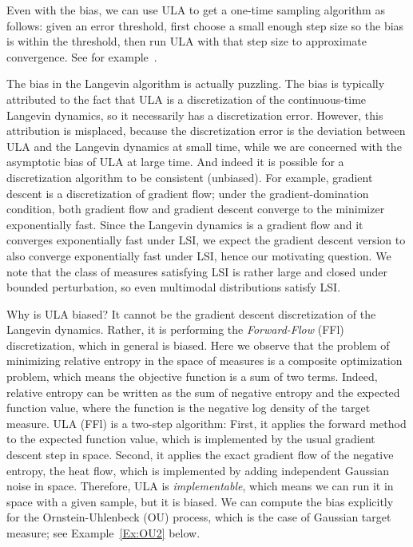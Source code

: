 \documentclass[final,12pt]{colt2018}
\begin{document}
Even with the bias, we can use ULA to get a one-time sampling algorithm as follows:
given an error threshold, first choose a small enough step size so the bias is within the threshold, then run ULA with that step size to approximate convergence.
See for example~\cite{D17,D17a,DK17,DM16,CB17}.

The bias in the Langevin algorithm is actually puzzling.
The bias is typically attributed to the fact that ULA is a discretization of the continuous-time Langevin dynamics, so it necessarily has a discretization error.
However, this attribution is misplaced, because
the discretization error is the deviation between ULA and the Langevin dynamics at small time,
while
we are concerned with
the asymptotic bias of ULA at large time. 
And indeed it is possible for a discretization algorithm to be consistent (unbiased).
For example, gradient descent is a discretization of gradient flow; under the gradient-domination condition, both gradient flow and gradient descent converge to the minimizer exponentially fast.
Since the Langevin dynamics is a gradient flow and it converges exponentially fast under LSI, we expect the gradient descent version to also converge exponentially fast under LSI, hence our motivating question.
We note that the class of measures satisfying LSI is rather large and closed under bounded perturbation, so even multimodal distributions satisfy LSI.

Why is ULA biased?
It cannot be the gradient descent discretization of the Langevin dynamics.
Rather, it is performing the {\em Forward-Flow} (FFl) discretization, which in general is biased.
Here we observe that the problem of minimizing relative entropy in the space of measures is a composite optimization problem, which means the objective function is a sum of two terms.
Indeed, relative entropy can be written as the sum of negative entropy and the expected function value, where the function is the negative log density of the target measure.
ULA (FFl) is a two-step algorithm: First, it applies the forward method to the expected function value, which is implemented by the usual gradient descent step in space.
Second, it applies the exact gradient flow of the negative entropy, the heat flow, which is implemented by adding independent Gaussian noise in space.
Therefore, ULA is {\em implementable}, which means we can run it in space with a given sample,
but it is biased.
We can compute the bias explicitly for the Ornstein-Uhlenbeck (OU) process, which is the case of Gaussian target measure; see Example~\ref{Ex:OU2} below.
\end{document}
